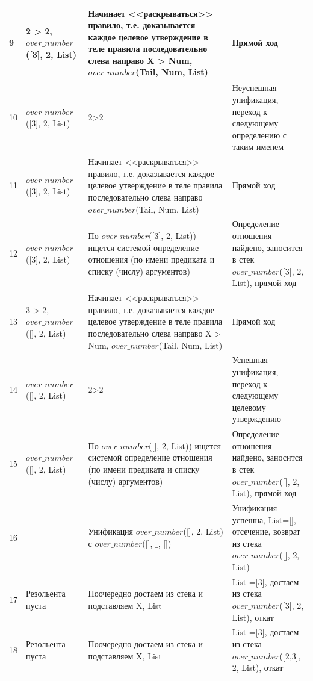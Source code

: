\documentclass[a4paper,14pt]{extreport} %
\begin{document}
\begin{longtable}{|p{0.5cm}|p{5cm}|p{6cm}|p{5.5cm}|}
	9 &2 > 2, $over\_number$([3], 2, List) & Начинает <<раскрываться>> правило, т.е. доказывается каждое целевое утверждение в теле правила последовательно слева направо
	X > Num, $over\_number$(Tail, Num, List) & Прямой ход\\ \hline
	
	10 & $over\_number$([3], 2, List) & 2>2 & Неуспешная унификация, переход к следующему определению с таким именем \\ \hline
	
	11 & $over\_number$([3], 2, List) & Начинает <<раскрываться>> правило, т.е. доказывается каждое целевое утверждение в теле правила последовательно слева направо
	$over\_number$(Tail, Num, List) & Прямой ход\\ \hline
	
	12 & $over\_number$([3], 2, List) & По $over\_number$([3], 2, List)) ищется системой определение отношения (по имени предиката и списку (числу) аргументов) & Определение отношения найдено, заносится в стек $over\_number$([3], 2, List), прямой ход \\ \hline
	
	13 &3 > 2, $over\_number$([], 2, List) & Начинает <<раскрываться>> правило, т.е. доказывается каждое целевое утверждение в теле правила последовательно слева направо
	X > Num, $over\_number$(Tail, Num, List) & Прямой ход\\ \hline
	
	14 & $over\_number$([], 2, List) & 2>2 & Успешная унификация, переход к следующему целевому утверждению \\ \hline
	
	15 & $over\_number$([], 2, List) & По $over\_number$([], 2, List)) ищется системой определение отношения (по имени предиката и списку (числу) аргументов) & Определение отношения найдено, заносится в стек $over\_number$([], 2, List), прямой ход \\ \hline
	
	16 &   & Унификация $over\_number$([], 2, List)  с $over\_number$([], $\_$, []) & Унификация успешна, List=[], отсечение, возврат из стека $over\_number$([], 2, List)\\ \hline	
	
	17 & Резольента пуста & Поочередно достаем из стека и подставляем X, List & List =[3], достаем из стека $over\_number$([3], 2, List), откат \\ \hline
	
	18 & Резольента пуста & Поочередно достаем из стека и подставляем X, List & List =[3], достаем из стека $over\_number$([2,3], 2, List), откат \\ \hline
	

\end{longtable}
\end{document}
